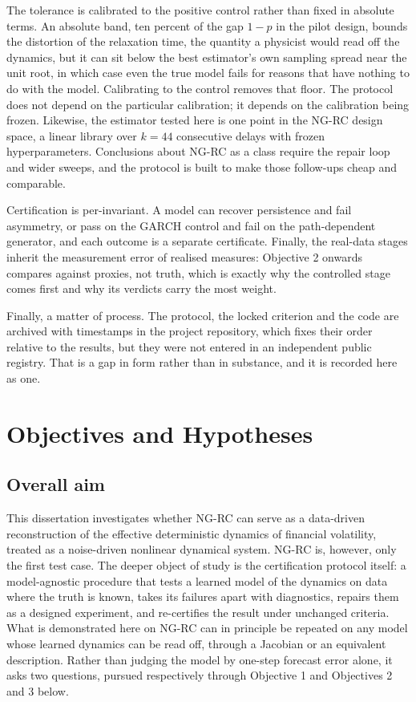 \documentclass[12pt,a4paper]{article}
\begin{document}
The tolerance is calibrated to the positive control rather than fixed
in absolute terms. An absolute band, ten percent of the gap $1-p$ in
the pilot design, bounds the distortion of the relaxation time, the
quantity a physicist would read off the dynamics, but it can sit below
the best estimator's own sampling spread near the unit root, in which
case even the true model fails for reasons that have nothing to do with
the model. Calibrating to the control removes that floor. The protocol
does not depend on the particular calibration; it depends on the
calibration being frozen. Likewise, the estimator tested here
is one point in the NG-RC design space, a linear library over $k=44$
consecutive delays with frozen hyperparameters. Conclusions about NG-RC
as a class require the repair loop and wider sweeps, and the protocol is
built to make those follow-ups cheap and comparable.

Certification is per-invariant. A model can recover persistence and fail
asymmetry, or pass on the GARCH control and fail on the path-dependent
generator, and each outcome is a separate certificate. Finally, the
real-data stages inherit the measurement error of realised measures:
Objective 2 onwards compares against proxies, not truth, which is
exactly why the controlled stage comes first and why its verdicts carry
the most weight.

Finally, a matter of process. The protocol, the locked criterion and
the code are archived with timestamps in the project repository, which
fixes their order relative to the results, but they were not entered in
an independent public registry. That is a gap in form rather than in
substance, and it is recorded here as one.

\newpage

\section{Objectives and Hypotheses}

\subsection{Overall aim}

This dissertation investigates whether NG-RC can serve as a data-driven
reconstruction of the effective deterministic dynamics of financial
volatility, treated as a noise-driven nonlinear dynamical system. NG-RC
is, however, only the first test case. The deeper object of study is the
certification protocol itself: a model-agnostic procedure that tests a
learned model of the dynamics on data where the truth is known, takes
its failures apart with diagnostics, repairs them as a designed
experiment, and re-certifies the result under unchanged criteria. What
is demonstrated here on NG-RC can in principle be repeated on any model
whose learned dynamics can be read off, through a Jacobian or an
equivalent description. Rather than judging the model by one-step
forecast error alone, it asks two questions, pursued respectively
through Objective 1 and Objectives 2 and 3 below.
\end{document}
